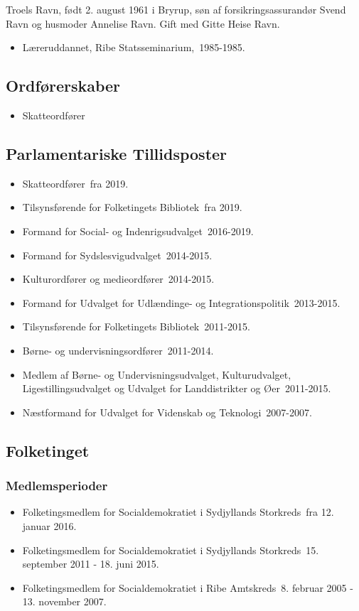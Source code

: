 \documentclass[11pt, a4paper]{awesome-cv}
\begin{document}
\makecvheader[R]
\makelettertitle
\begin{cvletter}
Troels Ravn, født 2. august 1961 i Bryrup, søn af forsikringsassurandør Svend Ravn og husmoder Annelise Ravn. Gift med Gitte Heise Ravn.

\begin{itemize}
\item Læreruddannet, Ribe Statsseminarium, 1985-1985.
\end{itemize}
\subsection*{Ordførerskaber}
\begin{itemize}
\item Skatteordfører
\end{itemize}
\subsection*{Parlamentariske Tillidsposter}
\begin{itemize}
\item Skatteordfører fra 2019.
\item Tilsynsførende for Folketingets Bibliotek fra 2019.
\item Formand for Social- og Indenrigsudvalget 2016-2019.
\item Formand for Sydslesvigudvalget 2014-2015.
\item Kulturordfører og medieordfører 2014-2015.
\item Formand for Udvalget for Udlændinge- og Integrationspolitik 2013-2015.
\item Tilsynsførende for Folketingets Bibliotek 2011-2015.
\item Børne- og undervisningsordfører 2011-2014.
\item Medlem af Børne- og Undervisningsudvalget, Kulturudvalget, Ligestillingsudvalget og Udvalget for Landdistrikter og Øer 2011-2015.
\item Næstformand for Udvalget for Videnskab og Teknologi 2007-2007.
\end{itemize}
\subsection*{Folketinget}
\subsubsection*{Medlemsperioder}
\begin{itemize}
\item Folketingsmedlem for Socialdemokratiet i Sydjyllands Storkreds fra 12. januar 2016.
\item Folketingsmedlem for Socialdemokratiet i Sydjyllands Storkreds 15. september 2011 - 18. juni 2015.
\item Folketingsmedlem for Socialdemokratiet i Ribe Amtskreds 8. februar 2005 - 13. november 2007.
\end{itemize}

\end{cvletter}
\end{document}

